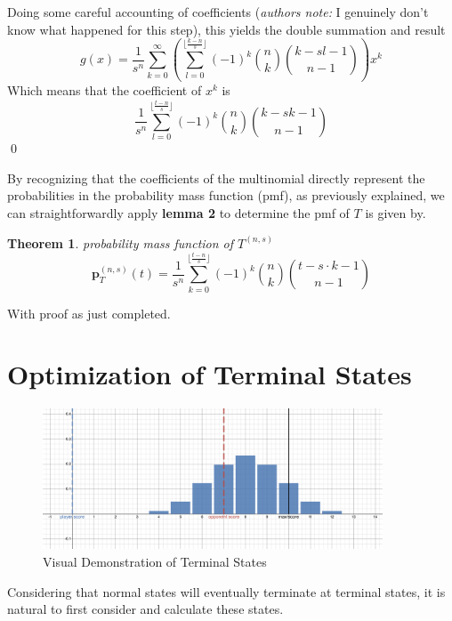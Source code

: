 \documentclass[a4paper]{article}
\newtheorem{theorem}{Theorem}
\renewenvironment{proof}{{\bfseries Proof}}{\qed}
\begin{document}
\begin{proof}
    Doing some careful accounting of coefficients (\textit{authors note:} I genuinely don't know what happened for this step), this yields the double summation and result
    $$
    g(x) = \frac{1}{s^n} \sum_{k = 0}^{\infty} \left(\sum_{l = 0}^{\lfloor\frac{k-n}{s} \rfloor} (-1)^k \binom{n}{k} \binom{k-sl-1}{n-1} \right) x^k
    $$
    Which means that the coefficient of $x^k$ is 
    $$
    \frac{1}{s^n} \sum_{l = 0}^{\lfloor\frac{t-n}{s} \rfloor} (-1)^k \binom{n}{k} \binom{k-sk-1}{n-1}
    $$ 
\end{proof}


By recognizing that the coefficients of the multinomial directly represent the probabilities in the probability mass function (pmf), as previously explained, we can straightforwardly apply \textbf{lemma 2} to determine the pmf of $T$ is given by.
%
\begin{theorem}{probability mass function of $T^{(n, s)}$}
    $$
    \textbf{p}_{T}^{(n, s)}(t) = \frac{1}{s^n} \sum_{k = 0}^{\lfloor\frac{t-n}{s} \rfloor} (-1)^k \binom{n}{k} \binom{t - s \cdot k - 1}{n-1}
    $$
\end{theorem}

With proof as just completed.


\section{Optimization of Terminal States}

\begin{figure}[h]
    \centering
    \includegraphics[width=0.9\textwidth]{Screenshot 2023-12-09 at 21.07.12.png}
    \caption{Visual Demonstration of Terminal States}
\end{figure}

Considering that normal states will eventually terminate at terminal states, it is natural to first consider and calculate these states.
\end{document}

